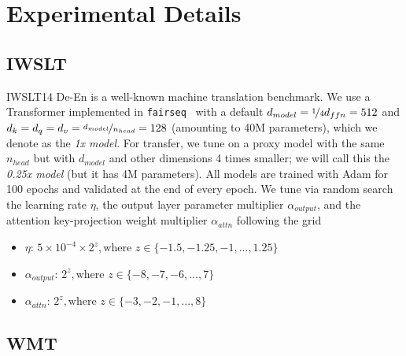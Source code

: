 \documentclass{article}
\theoremstyle{definition}
\begin{document}
\section{Experimental Details}
\label{sec:experimentaldetails}

\subsection{IWSLT}
\label{sec:IWSLTdetails}
IWSLT14 De-En is a well-known machine translation benchmark.
We use a Transformer implemented in \texttt{fairseq}~\citep{ott2019fairseq} with a default $d_{model} = \nicefrac{1}{4} d_{ffn} = 512$ and $d_{k}=d_{q}=d_{v}=\nicefrac{d_{model}}{n_{head}}=128$ (amounting to 40M parameters), which we denote as the \emph{1x model}.
For transfer, we tune on a proxy model with the same $n_{head}$ 
but with $d_{model}$ and other dimensions 4 times smaller; we will call this the \emph{0.25x model} (but it has 4M parameters).
All models are trained with Adam for 100 epochs and validated at the end of every epoch.
We tune via random search the learning rate $\eta$, the output layer parameter multiplier $\alpha_{output}$, and the attention key-projection weight multiplier $\alpha_{attn}$ following the grid
\begin{itemize}
    \item $\eta$: $5 \times 10^{-4} \times 2^z, \text{where } z\in \{-1.5, -1.25, -1, ..., 1.25\}$ %
    \item $\alpha_{output}$: $2^z, \text{where } z\in \{-8, -7, -6, ..., 7\}$ %
    \item $\alpha_{attn}$: $2^z, \text{where } z\in\{-3, -2, -1, ..., 8\}$ %
\end{itemize}

\subsection{WMT}
\label{sec:WMTdetails}
\end{document}
